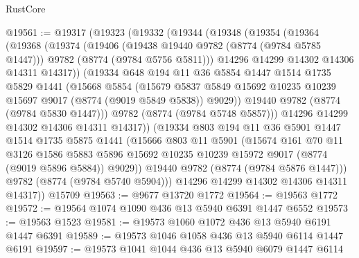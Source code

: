 \begin{lexlean}{RustCore}
\begin{coremodule}
@19561 := @19317
    (@19323
      (@19332
        (@19344
          (@19348
            (@19354
              (@19364
                (@19368
                  (@19374
                    (@19406
                      (@19438 @19440 @9782 (@8774 (@9784 @5785 @1447)))
                      @9782
                      (@8774 (@9784 @5756 @5811)))
                    @14296
                    @14299
                    @14302
                    @14306
                    @14311
                    @14317))
                (@19334
                  @648
                  @194
                  @11
                  @36
                  @5854
                  @1447
                  @1514
                  @1735
                  @5829
                  @1441
                  (@15668
                    @5854
                    (@15679
                      @5837
                      @5849
                      @15692
                      @10235
                      @10239
                      @15697
                      @9017
                      (@8774 (@9019 @5849 @5838))
                      @9029))
                  @19440
                  @9782
                  (@8774 (@9784 @5830 @1447)))
                @9782
                (@8774 (@9784 @5748 @5857)))
              @14296
              @14299
              @14302
              @14306
              @14311
              @14317))
          (@19334
            @803
            @194
            @11
            @36
            @5901
            @1447
            @1514
            @1735
            @5875
            @1441
            (@15666
              @803
              @11
              @5901
              (@15674
                @161
                @70
                @11
                @3126
                @1586
                @5883
                @5896
                @15692
                @10235
                @10239
                @15972
                @9017
                (@8774 (@9019 @5896 @5884))
                @9029))
            @19440
            @9782
            (@8774 (@9784 @5876 @1447)))
          @9782
          (@8774 (@9784 @5740 @5904)))
        @14296
        @14299
        @14302
        @14306
        @14311
        @14317))
    @15709
@19563 := @9677 @13720 @1772
@19564 := @19563 @1772
@19572 := @19564 @1074 @1090 @436 @13 @5940 @6391 @1447 @6552
@19573 := @19563 @1523
@19581 := @19573 @1060 @1072 @436 @13 @5940 @6191 @1447 @6391
@19589 := @19573 @1046 @1058 @436 @13 @5940 @6114 @1447 @6191
@19597 := @19573 @1041 @1044 @436 @13 @5940 @6079 @1447 @6114

\end{coremodule}
\end{lexlean}
